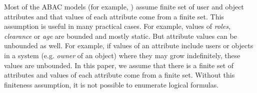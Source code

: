 Most of the ABAC models (for example, \cite{abacAlpha,hgabac,abac-ws,abac-for-web-service}) assume finite set of user and  object attributes and that values of each attribute come from a finite set. This assumption is useful in many practical cases. For example, values of \textit{roles}, \textit{clearance} or \textit{age} are bounded and mostly static. But attribute values can be unbounded as well. For example, if values of an attribute include users or objects in a system  (e.g. \textit{owner} of an object) where they may grow indefinitely, these values are unbounded.  In this paper, we assume that there is a finite set of attributes and values of each attribute come from a finite set. Without this finiteness assumption, it is not possible to enumerate logical formulas.





